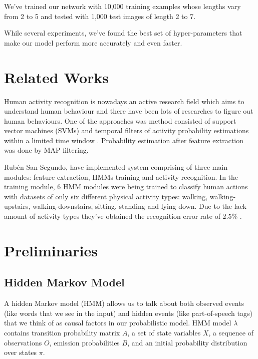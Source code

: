 \documentclass[10pt,twocolumn,letterpaper]{article}
\begin{document}
We've trained our network with 10,000 training examples whose lengths vary from 2 to 5 and tested with 1,000 test images of length 2 to 7.

While several experiments, we've found the best set of hyper-parameters that make our model perform more accurately and even faster.


\section{Related Works}
Human activity recognition is nowadays an active research field which aims to understand human behaviour and there have been lots of researches to figure out human behaviours. One of the approaches was method consisted of support vector machines (SVMs) and temporal filters of activity probability estimations within a limited time window \cite{haptpaper}. Probability estimation after feature extraction was done by MAP filtering.

Rubén San-Segundo, \etal have implemented system comprising of three main modules: feature extraction, HMMs training and activity recognition. In the training module, 6 HMM modules were being trained to classify human actions with datasets of only six different physical activity types: walking, walking-upstairs, walking-downstairs, sitting, standing and lying down. Due to the lack amount of activity types they've obtained the recognition error rate of 2.5\% \cite{monitoring}.

\section{Preliminaries}

\subsection{Hidden Markov Model}


A hidden Markov model (HMM) allows us to talk about both observed events (like words that we see in the input) and hidden events (like part-of-speech tags) that we think of as causal factors in our probabilistic model. HMM model $\lambda$ contains transition probability matrix $A$, a set of state variables $X$, a sequence of observations $O$, emission probabilities $B$, and an initial probability distribution over states $\pi$.
\end{document}
